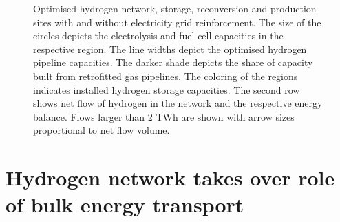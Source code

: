 \begin{figure}
    \centering
     \caption{Optimised hydrogen network, storage, reconversion and production
    sites with and without electricity grid reinforcement. The size of the
    circles depicts the electrolysis and fuel cell capacities in the respective
    region. The line widths depict the optimised hydrogen pipeline capacities.
    The darker shade depicts the share of capacity built from retrofitted gas
    pipelines. The coloring of the regions indicates installed hydrogen storage
    capacities. The second row shows net flow of hydrogen in the network and the
    respective energy balance. Flows larger than 2 TWh are shown with
    arrow sizes proportional to net flow volume.}
    \label{fig:h2-network}
\end{figure}

\section*{Hydrogen network takes over role of bulk energy transport}
\label{sec:energy-moved}

